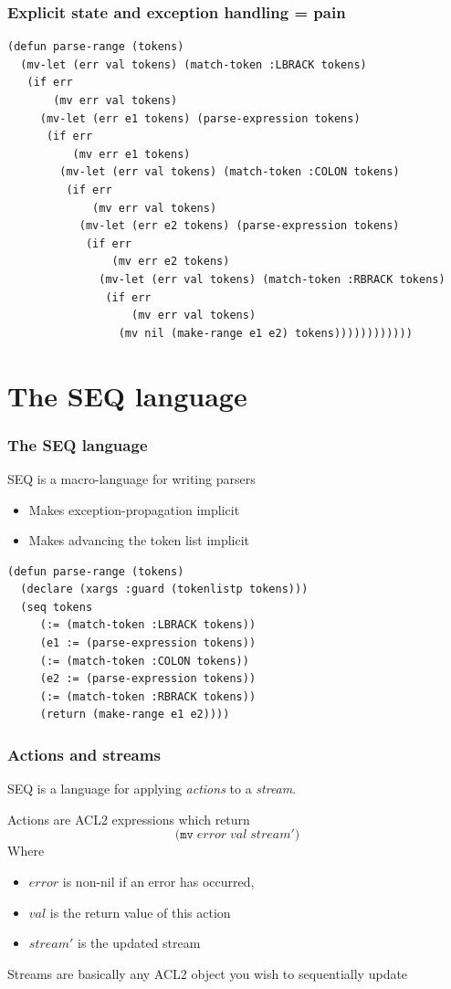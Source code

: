 \documentclass{beamer}
\newcommand{\SmallSkip}{\vspace{0.5cm}\noindent}
\begin{document}
\begin{frame}[fragile]
\frametitle{Explicit state and exception handling = pain}

{\small
\begin{verbatim}
(defun parse-range (tokens)
  (mv-let (err val tokens) (match-token :LBRACK tokens)
   (if err
       (mv err val tokens)
     (mv-let (err e1 tokens) (parse-expression tokens)
      (if err
          (mv err e1 tokens)
        (mv-let (err val tokens) (match-token :COLON tokens)
         (if err
             (mv err val tokens)
           (mv-let (err e2 tokens) (parse-expression tokens)
            (if err
                (mv err e2 tokens)
              (mv-let (err val tokens) (match-token :RBRACK tokens)
               (if err
                   (mv err val tokens)
                 (mv nil (make-range e1 e2) tokens))))))))))))
\end{verbatim}
}

\end{frame}

\section[The SEQ language]{The SEQ language}
\begin{frame}[fragile]
\frametitle{The SEQ language}

SEQ is a macro-language for writing parsers
\begin{itemize}
\item Makes exception-propagation implicit
\item Makes advancing the token list implicit
\end{itemize}

\begin{verbatim}
(defun parse-range (tokens)
  (declare (xargs :guard (tokenlistp tokens)))
  (seq tokens
     (:= (match-token :LBRACK tokens))
     (e1 := (parse-expression tokens))
     (:= (match-token :COLON tokens))
     (e2 := (parse-expression tokens))
     (:= (match-token :RBRACK tokens))
     (return (make-range e1 e2))))
\end{verbatim}

\end{frame}


\begin{frame}[fragile]
\frametitle{Actions and streams}
SEQ is a language for applying {\em actions} to a {\em stream}.

\SmallSkip
Actions are ACL2 expressions which return
\[
\texttt{(mv} \; \mathit{error} \; \mathit{val} \; \mathit{stream}' \texttt{)}
\]
Where
\begin{itemize}
\item $\mathit{error}$ is non-nil if an error has occurred,
\item $\mathit{val}$ is the return value of this action
\item $\mathit{stream'}$ is the updated stream
\end{itemize}

\SmallSkip
Streams are basically any ACL2 object you wish to sequentially update
\end{frame}
\end{document}
